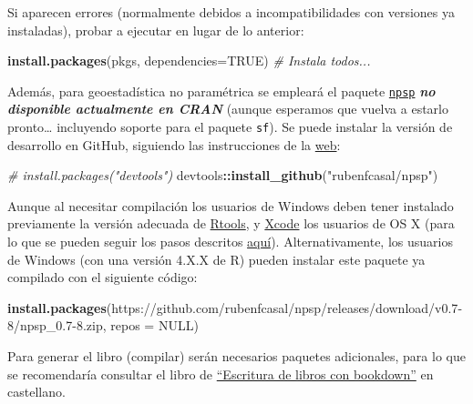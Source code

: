 \documentclass[
]{book}
\newenvironment{Shaded}{\begin{snugshade}}{\end{snugshade}}
\newcommand{\AttributeTok}[1]{\textcolor[rgb]{0.13,0.29,0.53}{#1}}
\newcommand{\CommentTok}[1]{\textcolor[rgb]{0.56,0.35,0.01}{\textit{#1}}}
\newcommand{\ConstantTok}[1]{\textcolor[rgb]{0.56,0.35,0.01}{#1}}
\newcommand{\FunctionTok}[1]{\textcolor[rgb]{0.13,0.29,0.53}{\textbf{#1}}}
\newcommand{\NormalTok}[1]{#1}
\newcommand{\SpecialCharTok}[1]{\textcolor[rgb]{0.81,0.36,0.00}{\textbf{#1}}}
\newcommand{\StringTok}[1]{\textcolor[rgb]{0.31,0.60,0.02}{#1}}
\theoremstyle{break}
\theoremstyle{definition}
\theoremstyle{definition}
\theoremstyle{definition}
\theoremstyle{definition}
\theoremstyle{remark}
\begin{document}
Si aparecen errores (normalmente debidos a incompatibilidades con versiones ya instaladas), probar a ejecutar en lugar de lo anterior:

\begin{Shaded}
\begin{Highlighting}[]
\FunctionTok{install.packages}\NormalTok{(pkgs, }\AttributeTok{dependencies=}\ConstantTok{TRUE}\NormalTok{) }\CommentTok{\# Instala todos...}
\end{Highlighting}
\end{Shaded}

Además, para geoestadística no paramétrica se empleará el paquete \href{https://rubenfcasal.github.io/npsp}{\texttt{npsp}} \textbf{\emph{no disponible actualmente en CRAN}} (aunque esperamos que vuelva a estarlo pronto\ldots{} incluyendo soporte para el paquete \texttt{sf}).
Se puede instalar la versión de desarrollo en GitHub, siguiendo las instrucciones de la \href{https://rubenfcasal.github.io/npsp/\#installation}{web}:

\begin{Shaded}
\begin{Highlighting}[]
\CommentTok{\# install.packages("devtools")}
\NormalTok{devtools}\SpecialCharTok{::}\FunctionTok{install\_github}\NormalTok{(}\StringTok{"rubenfcasal/npsp"}\NormalTok{)}
\end{Highlighting}
\end{Shaded}

Aunque al necesitar compilación los usuarios de Windows deben tener instalado previamente la versión adecuada de \href{https://cran.r-project.org/bin/windows/Rtools/}{Rtools}, y \href{https://apps.apple.com/us/app/xcode/id497799835}{Xcode} los usuarios de OS X
(para lo que se pueden seguir los pasos descritos \href{https://rubenfcasal.github.io/post/instalacion-de-r}{aquí}).
Alternativamente, los usuarios de Windows (con una versión 4.X.X de R) pueden instalar este paquete ya compilado con el siguiente código:

\begin{Shaded}
\begin{Highlighting}[]
\FunctionTok{install.packages}\NormalTok{(}\StringTok{\textquotesingle{}https://github.com/rubenfcasal/npsp/releases/download/v0.7{-}8/npsp\_0.7{-}8.zip\textquotesingle{}}\NormalTok{, }
                 \AttributeTok{repos =} \ConstantTok{NULL}\NormalTok{)}
\end{Highlighting}
\end{Shaded}

Para generar el libro (compilar) serán necesarios paquetes adicionales,
para lo que se recomendaría consultar el libro de \href{https://rubenfcasal.github.io/bookdown_intro}{``Escritura de libros con bookdown''} en castellano.
\end{document}
